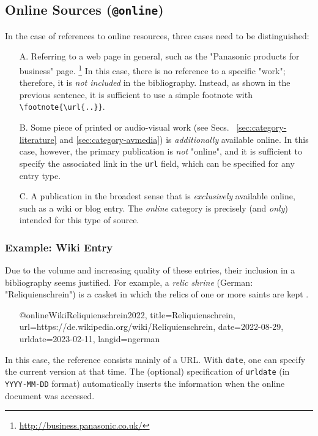 \subsection{Online Sources (\texttt{\bfseries @online})}
\label{sec:category-online}

In the case of references to online resources, three cases need to be
distinguished:
%
\begin{itemize}
    \item[A.] Referring to a web page in general, such as the "Panasonic
    products for business" page.%
    \footnote{\url{http://business.panasonic.co.uk/}}
    In this case, there is no reference to a specific "work"; therefore, it is
    \emph{not included} in the bibliography. Instead, as shown in the previous
    sentence, it is sufficient to use a simple footnote with
    \verb!\footnote{\url{..}}!.
%
    \item[B.] Some piece of printed or audio-visual work (see Secs.~%
    \ref{sec:category-literature} and \ref{sec:category-avmedia}) is
    \emph{additionally} available online. In this case, however, the primary
    publication is \emph{not} "online", and it is sufficient to specify the
    associated link in the \texttt{url} field, which can be specified for any
    entry type.
%
    \item[C.] A publication in the broadest sense that is
    \emph{exclusively} available online, such as a wiki or blog entry. The \emph{online} category
    is precisely (and \emph{only}) intended for this type of source.
\end{itemize}

\subsubsection{Example: Wiki Entry}
\label{sec:@online-www}

Due to the volume and increasing quality of these entries, their inclusion in
a bibliography seems justified. For example, a \emph{relic shrine} (German:
"Reliquienschrein") is a casket in which the relics of one or more saints are
kept \cite{WikiReliquienschrein2022}.
%
\begin{itemize}
\item[]
\begin{GenericCode}[numbers=none]
@online{WikiReliquienschrein2022,
  title={Reliquienschrein},
  url={https://de.wikipedia.org/wiki/Reliquienschrein},
  date={2022-08-29},
  urldate={2023-02-11},
  langid={ngerman}
}
\end{GenericCode}
\item[\cite{WikiReliquienschrein2022}] 
\end{itemize}
%
In this case, the reference consists mainly of a URL. With \texttt{date}, one
can specify the current version at that time. The (optional) specification of
\texttt{urldate} (in \texttt{YYYY-MM-DD} format) automatically inserts the
information when the online document was accessed.


